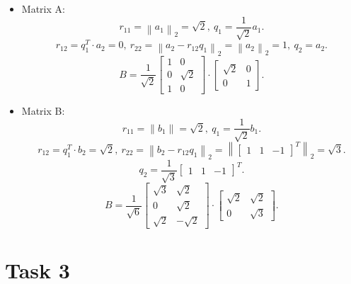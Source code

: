 \documentclass[14pt, notitlepage]{article}
\newcommand{\norm}[1]{\left\lVert#1\right\rVert}
\begin{document}
\begin{itemize}
    \item Matrix A:
    \[
        r_{11} = \norm{a_1}_2 = \sqrt{2},\ q_{1} = \frac{1}{\sqrt{2}} a_1.
    \]
    \[
        r_{12} = q_{1}^T \cdot a_2 = 0,\ r_{22} = \norm{a_2 - r_{12}q_1}_2 =
        \norm{a_2}_2 = 1,\ q_2 = a_2.
    \]
    \[
        B = \frac{1}{\sqrt{2}}\begin{bmatrix}
            1 & 0 \\
            0 & \sqrt{2} \\
            1 & 0
        \end{bmatrix} \cdot \begin{bmatrix}
            \sqrt{2} & 0 \\
            0 & 1
        \end{bmatrix}.
    \]

    \item Matrix B:
    \[
        r_{11} = \norm{b_1} = \sqrt{2},\ q_{1} = \frac{1}{\sqrt{2}} b_1.
    \]
    \[
        r_{12} = q_1^T \cdot b_2 = \sqrt{2},\ r_{22} = \norm{b_2 - r_{12}q_{1}}_2 =
        \norm{\begin{bmatrix} 1 & 1 & -1 \end{bmatrix}^T}_2 = \sqrt{3}.
    \]
    \[
        q_2 = \frac{1}{\sqrt{3}}\begin{bmatrix}
            1 & 1 & -1
        \end{bmatrix}^T.
    \]
    \[
        B = \frac{1}{\sqrt{6}}\begin{bmatrix}
            \sqrt{3} &  \sqrt{2} \\
            0        &  \sqrt{2} \\
            \sqrt{2} & -\sqrt{2}
        \end{bmatrix} \cdot \begin{bmatrix}
            \sqrt{2} & \sqrt{2} \\
            0        & \sqrt{3}
        \end{bmatrix}.
    \]
\end{itemize}

\section*{Task 3}
\end{document}
